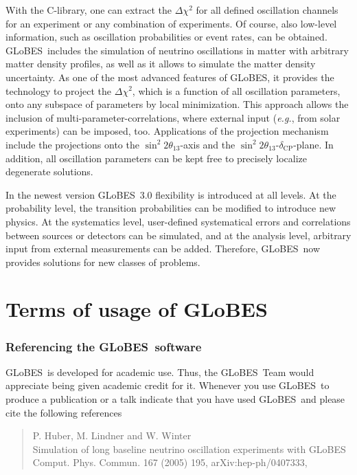 \documentclass[a4paper,12pt,twoside]{book}
\newcommand{\glbxxx}{hep-ph/0407333}
\newcommand{\deltacp}{\delta_{\mathrm{CP}}}
\newcommand{\stheta}{\sin^2 2 \theta_{13}}
\newcommand{\eg}{{\it e.g.}}
\newcommand{\GLOBES}{{\sf GLoBES}}
\begin{document}
With the C-library, one can extract the $\Delta \chi^2$ for all defined 
oscillation channels for an experiment or any combination of experiments.
Of course, also low-level information, such as oscillation
probabilities or event rates, can be obtained. \GLOBES\ includes the
simulation of neutrino oscillations in matter with arbitrary matter 
density profiles, as well as it allows to simulate the matter density
uncertainty. As one of the most
advanced features of \GLOBES , it provides the technology to 
project the $\Delta \chi^2$, which is a function of all oscillation
parameters, onto any subspace of parameters by local minimization. 
This approach allows the inclusion of multi-parameter-correlations,
where external input (\eg, from solar experiments) can be imposed, too.
Applications of the projection mechanism include the projections onto the $\stheta$-axis and the $\stheta$-$\deltacp$-plane. In addition, all oscillation parameters can be kept free to precisely localize 
degenerate solutions.

In the newest version \GLOBES\ 3.0 flexibility is introduced at all levels. At the probability level,
the transition probabilities can be modified to introduce new physics. At the systematics level,
user-defined systematical errors and correlations between sources or detectors can be simulated,
and at the analysis level, arbitrary  input from external measurements can be added.
Therefore, \GLOBES\ now provides solutions for new classes of problems.

\chapter*{Terms of usage of \GLOBES}

\subsection*{Referencing the \GLOBES\ software}

\GLOBES\ is developed for academic use. Thus, the \GLOBES\ Team would
appreciate being given academic credit for it. Whenever you use \GLOBES\
to produce a publication or a talk indicate that you have used \GLOBES\ and
please cite the following references~\cite{globes_paper,globes_paper_two}
\begin{quote}
P. Huber, M. Lindner and W. Winter\\
Simulation of long baseline neutrino oscillation experiments with \GLOBES\\
Comput. Phys. Commun. 167 (2005) 195, arXiv:\glbxxx,
\end{quote}
\end{document}
